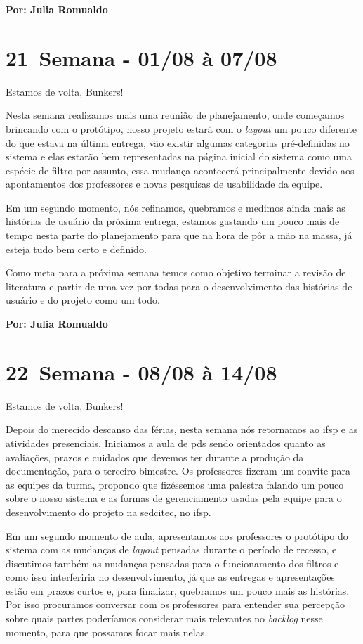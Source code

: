 \textbf{Por: Julia Romualdo}

\section{21\textordfeminine \, Semana - 01/08 à 07/08}
Estamos de volta, Bunkers!

Nesta semana realizamos mais uma reunião de planejamento, onde começamos brincando com o protótipo, nosso projeto estará com o \textit{layout} um pouco diferente do que estava na última entrega, vão existir algumas categorias pré-definidas no sistema e elas estarão bem representadas na página inicial do sistema como uma espécie de filtro por assunto, essa mudança acontecerá principalmente devido aos apontamentos dos professores e novas pesquisas de usabilidade da equipe. 

Em um segundo momento, nós refinamos, quebramos e medimos ainda mais as histórias de usuário da próxima entrega, estamos gastando um pouco mais de tempo nesta parte do planejamento para que na hora de pôr a mão na massa, já esteja tudo bem certo e definido.

Como meta para a próxima semana temos como objetivo terminar a revisão de literatura e partir de uma vez por todas para o desenvolvimento das histórias de usuário e do projeto como um todo.

\textbf{Por: Julia Romualdo}

\section{22\textordfeminine \, Semana - 08/08 à 14/08}
Estamos de volta, Bunkers!

Depois do merecido descanso das férias, nesta semana nós retornamos ao \acs{ifsp} e as atividades presenciais. Iniciamos a aula de \acs{pds} sendo orientados quanto as avaliações, prazos e cuidados que devemos ter durante a produção da documentação, para o terceiro bimestre. Os professores fizeram um convite para as equipes da turma, propondo que fizéssemos uma palestra falando um pouco sobre o nosso sistema e as formas de gerenciamento usadas pela equipe para o desenvolvimento do projeto na \gls{sedcitec}, no \acs{ifsp}. 

Em um segundo momento de aula, apresentamos aos professores o protótipo do sistema com as mudanças de \textit{layout} pensadas durante o período de recesso, e discutimos também as mudanças pensadas para o funcionamento dos filtros e como isso interferiria no desenvolvimento, já que as entregas e apresentações estão em prazos curtos e, para finalizar, quebramos um pouco mais as histórias. Por isso procuramos conversar com os professores para entender sua percepção sobre quais partes poderíamos considerar mais relevantes no \textit{backlog} nesse momento, para que possamos focar mais nelas.

